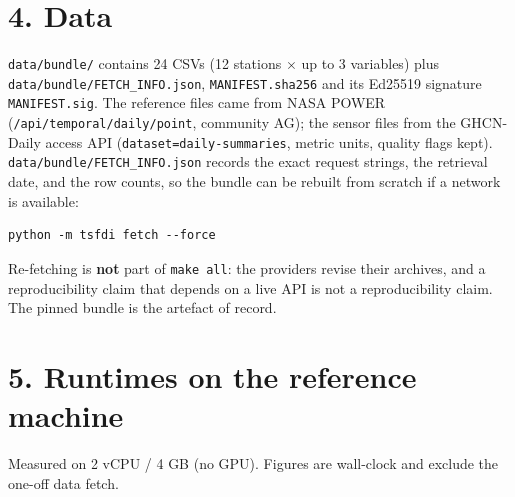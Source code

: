 \documentclass[10pt,a4paper]{article}
\begin{document}
\section*{4. Data}
\texttt{data/\allowbreak{}bundle/\allowbreak{}} contains 24 CSVs (12 stations $\times$ up to 3 variables) plus \texttt{data/\allowbreak{}bundle/\allowbreak{}FETCH\_\allowbreak{}INFO.json}, \texttt{MANIFEST.sha256} and its Ed25519 signature \texttt{MANIFEST.sig}. The reference files came from NASA POWER (\texttt{/\allowbreak{}api/\allowbreak{}temporal/\allowbreak{}daily/\allowbreak{}point}, community AG); the sensor files from the GHCN-\allowbreak{}Daily access API (\texttt{dataset=daily-\allowbreak{}summaries}, metric units, quality flags kept). \texttt{data/\allowbreak{}bundle/\allowbreak{}FETCH\_\allowbreak{}INFO.json} records the exact request strings, the retrieval date, and the row counts, so the bundle can be rebuilt from scratch if a network is available:

\begin{Verbatim}[breaklines=true,breakanywhere=true,fontsize=\footnotesize,frame=none,numbers=none]
python -m tsfdi fetch --force
\end{Verbatim}

Re-\allowbreak{}fetching is \textbf{not} part of \texttt{make all}: the providers revise their archives, and a reproducibility claim that depends on a live API is not a reproducibility claim. The pinned bundle is the artefact of record.

\section*{5. Runtimes on the reference machine}
Measured on 2 vCPU /\allowbreak{} 4 GB (no GPU). Figures are wall-\allowbreak{}clock and exclude the one-\allowbreak{}off data fetch.
\end{document}
